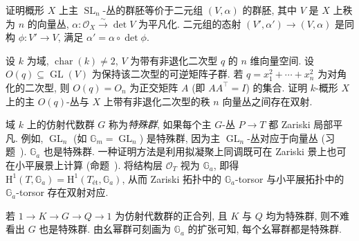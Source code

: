 \begin{exercise}[主特殊线性群丛]\label{src:B.1.59}
证明概形 $X$ 上主 $\operatorname{SL}_n$-丛的群胚等价于二元组 $(V,\alpha)$ 的群胚, 其中 $V$ 是 $X$ 上秩为 $n$ 的向量丛, $\alpha:\mathcal O_X\xrightarrow{\sim}\det V$ 为平凡化. 二元组的态射 $(V',\alpha')\to(V,\alpha)$ 是同构 $\phi:V'\to V$, 满足 $\alpha'=\alpha\circ\det\phi$.
\end{exercise}
\begin{exercise}[正交群]\label{src:B.1.60}
设 $k$ 为域, $\operatorname{char}(k)\ne2$, $V$ 为带有非退化二次型 $q$ 的 $n$ 维向量空间. 设 $O(q)\subseteq\operatorname{GL}(V)$ 为保持该二次型的可逆矩阵子群. 若 $q=x_1^2+\cdots+x_n^2$ 为对角化的二次型, 则 $O(q)=O_n$ 为正交矩阵 $A$ (即 $AA^\top=I$) 的集合. 证明 $k$-概形 $X$ 上的主 $O(q)$-丛与 $X$ 上带有非退化二次型的秩 $n$ 向量丛之间存在双射.
\end{exercise}
\clearpage
\begin{example}[特殊群]\label{src:B.1.61}
域 $k$ 上的仿射代数群 $G$ 称为\textit{特殊群}, 如果每个主 $G$-丛 $P\to T$ 都 Zariski 局部平凡. 例如, $\operatorname{GL}_n$ (如 $\mathbb G_m=\operatorname{GL}_n$) 是特殊群, 因为主 $\operatorname{GL}_n$-丛对应于向量丛 (习题~). $\mathbb G_a$ 也是特殊群. 一种证明方法是利用拟凝聚上同调既可在 Zariski 景上也可在小平展景上计算 (命题~). 将结构层 $\mathcal O_T$ 视为 $\mathbb G_a$, 即得 $\mathrm H^1(T,\mathbb G_a)=\mathrm H^1(T_{\text{ét}},\mathbb G_a)$, 从而 Zariski 拓扑中的 $\mathbb G_a$-torsor 与小平展拓扑中的 $\mathbb G_a$-torsor 存在双射对应.

若 $1\to K\to G\to Q\to1$ 为仿射代数群的正合列, 且 $K$ 与 $Q$ 均为特殊群, 则不难看出 $G$ 也是特殊群. 由幺幂群可刻画为 $\mathbb G_a$ 的扩张可知, 每个幺幂群都是特殊群.
\end{example}

